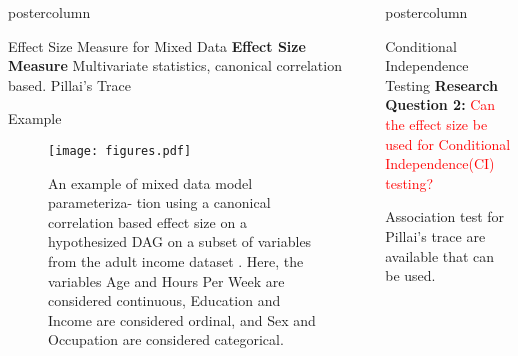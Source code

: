 \documentclass{beamer}
\newlength{\columnheight}
\begin{document}
\begin{frame}
\begin{columns}
\begin{column}{.33\textwidth}
\begin{beamercolorbox}[center]{postercolumn}
\begin{minipage}{.98\textwidth}
{\begin{myblock}{Effect Size Measure for Mixed Data}
		\textbf{Effect Size Measure}
		Multivariate statistics, canonical correlation based.
		Pillai's Trace

	\end{myblock}\vfill
	\begin{myblock}{Example}
		\begin{figure}
			\texttt{[image: figures.pdf]}
			\caption{An example of mixed data model parameteriza-
				tion using a canonical correlation based effect
				size on a hypothesized DAG on a subset of
				variables from the adult income dataset \citep{kohavi1996}.
				Here, the variables Age and
				Hours Per Week are considered continuous,
				Education and Income are considered ordinal,
				and Sex and Occupation are considered categorical.
			}
		\end{figure}
	\end{myblock}
		}\end{minipage}\end{beamercolorbox}
	\end{column}


	\begin{column}{0.33\textwidth}
		\begin{beamercolorbox}[center]{postercolumn}
			\begin{minipage}{.98\textwidth} %
				\parbox[t][\columnheight]{\textwidth}{ %
	\begin{myblock}{Conditional Independence Testing}
		\textbf{Research Question 2:} \textcolor{red}{Can the effect size be used for Conditional Independence(CI) testing?}

		Association test for Pillai's trace are available that can be used.


\end{myblock}}
\end{minipage}
\end{beamercolorbox}
\end{column}
\end{columns}
\end{frame}
\end{document}
